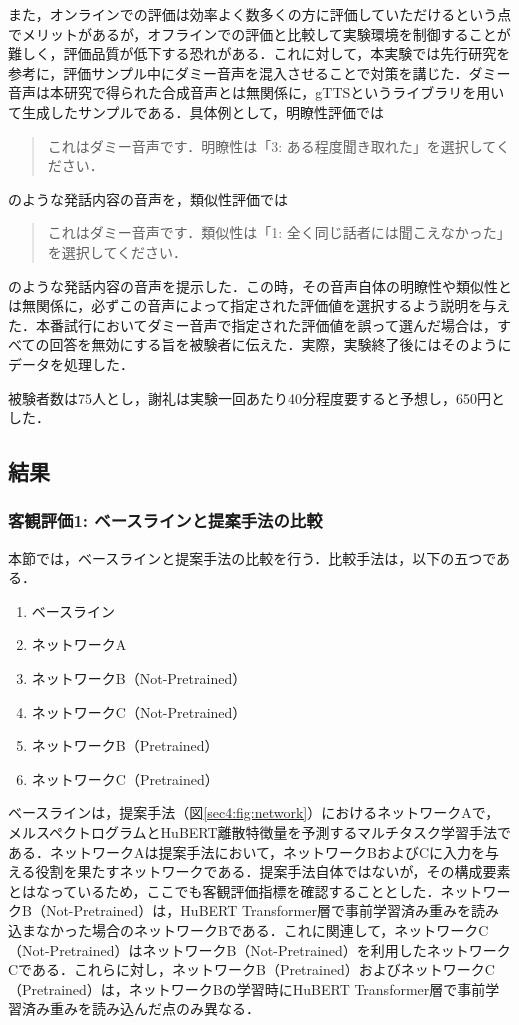 \documentclass[12pt]{jarticle}
\numberwithin{equation}{section}    %
\numberwithin{figure}{section}      %
\numberwithin{table}{section}      %
\begin{document}
また，オンラインでの評価は効率よく数多くの方に評価していただけるという点でメリットがあるが，オフラインでの評価と比較して実験環境を制御することが難しく，評価品質が低下する恐れがある．これに対して，本実験では先行研究\cite{kirkland2023stuck}を参考に，評価サンプル中にダミー音声を混入させることで対策を講じた．ダミー音声は本研究で得られた合成音声とは無関係に，gTTSというライブラリを用いて生成したサンプルである．具体例として，明瞭性評価では
\begin{quote}
    これはダミー音声です．明瞭性は「3: ある程度聞き取れた」を選択してください．
\end{quote}
のような発話内容の音声を，類似性評価では
\begin{quote}
    これはダミー音声です．類似性は「1: 全く同じ話者には聞こえなかった」を選択してください．
\end{quote}
のような発話内容の音声を提示した．この時，その音声自体の明瞭性や類似性とは無関係に，必ずこの音声によって指定された評価値を選択するよう説明を与えた．本番試行においてダミー音声で指定された評価値を誤って選んだ場合は，すべての回答を無効にする旨を被験者に伝えた．実際，実験終了後にはそのようにデータを処理した．

被験者数は75人とし，謝礼は実験一回あたり40分程度要すると予想し，650円とした．

\subsection{結果}
\subsubsection{客観評価1: ベースラインと提案手法の比較}
\label{sec4:sec:obj_1}
本節では，ベースラインと提案手法の比較を行う．比較手法は，以下の五つである．
\begin{enumerate}
    \item ベースライン
    \item ネットワークA
    \item ネットワークB（Not-Pretrained）
    \item ネットワークC（Not-Pretrained）
    \item ネットワークB（Pretrained）
    \item ネットワークC（Pretrained）
\end{enumerate}
ベースラインは，提案手法（図\ref{sec4:fig:network}）におけるネットワークAで，メルスペクトログラムとHuBERT離散特徴量を予測するマルチタスク学習手法である．ネットワークAは提案手法において，ネットワークBおよびCに入力を与える役割を果たすネットワークである．提案手法自体ではないが，その構成要素とはなっているため，ここでも客観評価指標を確認することとした．ネットワークB（Not-Pretrained）は，HuBERT Transformer層で事前学習済み重みを読み込まなかった場合のネットワークBである．これに関連して，ネットワークC（Not-Pretrained）はネットワークB（Not-Pretrained）を利用したネットワークCである．これらに対し，ネットワークB（Pretrained）およびネットワークC（Pretrained）は，ネットワークBの学習時にHuBERT Transformer層で事前学習済み重みを読み込んだ点のみ異なる．
\end{document}
